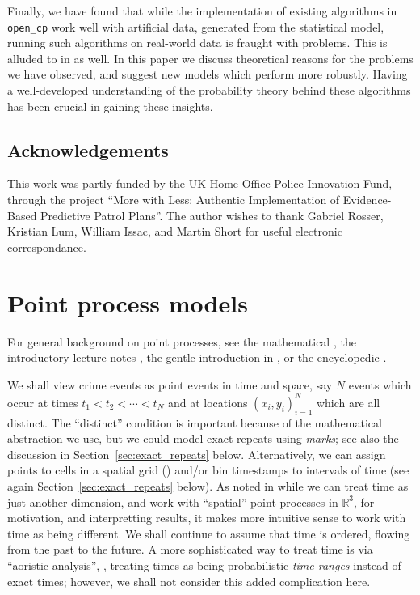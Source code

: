 \documentclass[twoside,a4paper]{article}
\theoremstyle{plain}
\theoremstyle{definition}
\begin{document}
Finally, we have found that while the implementation of existing algorithms in
\texttt{open\_cp} work well with artificial data, generated from the statistical model,
running such algorithms on real-world data is fraught with problems.  This is alluded to
in \cite{rc} as well.  In this paper we discuss theoretical reasons for the problems we
have observed, and suggest new models which perform more robustly.  Having a well-developed
understanding of the probability theory behind these algorithms has been crucial in gaining
these insights.


\subsection{Acknowledgements}

This work was partly funded by the UK Home Office Police Innovation Fund, through the
project ``More with Less: Authentic Implementation of Evidence-Based Predictive
Patrol Plans''.  The author wishes to thank Gabriel Rosser, Kristian Lum, William Issac,
and Martin Short for useful electronic correspondance.



\section{Point process models}

For general background on point processes, see the mathematical \cite{dvj}, the
introductory lecture notes \cite{ras}, the gentle introduction in \cite[Chapter~8]{rip},
or the encyclopedic \cite{handbookss}.

We shall view crime events as point events in time and space, say $N$ events which occur
at times $t_1 < t_2 < \cdots < t_N$ and at locations $(x_i, y_i)_{i=1}^N$ which are all
distinct.  The ``distinct'' condition is important because of the
mathematical abstraction we use, but we could model exact repeats using \emph{marks};
see also the discussion in Section~\ref{sec:exact_repeats} below.
Alternatively, we can assign points to cells in a spatial grid
(\cite{sepp2}) and/or bin timestamps to intervals of time (see again
Section~\ref{sec:exact_repeats} below).
As noted in \cite[Part~V]{handbookss} while we can treat time as just another dimension,
and work with ``spatial'' point processes in $\mathbb R^3$, for motivation, and interpretting
results, it makes more intuitive sense to work with time as being different.  We shall
continue to assume that time is ordered, flowing from the past to the future.
A more sophisticated way to treat time is via ``aoristic analysis'', \cite{ratcliffe},
treating times as being probabilistic \emph{time ranges} instead of exact times; however,
we shall not consider this added complication here.
\end{document}
